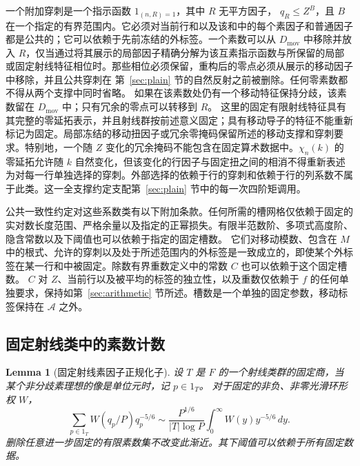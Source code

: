 \documentclass[11pt,a4paper]{article}
\numberwithin{equation}{section}
\numberwithin{figure}{section}
\newtheorem{lemma}[theorem]{Lemma}
\theoremstyle{definition}
\theoremstyle{remark}
\begin{document}
一个附加穿刺是一个指示函数 $1_{(n,R)=1}$，其中 $R$ 无平方因子，
$q_R\le Z^B$，且 $B$ 在一个指定的有界范围内。它必须对当前行和以及该和中的每个素因子和普通因子都是公共的；它可以依赖于先前冻结的外标签。一个素数可以从
$D_{\mathrm{mov}}$ 中移除并放入 $R$，仅当通过将其展示的局部因子精确分解为该互素指示函数与所保留的局部或固定射线特征相位时。那些相位必须保留，重构后的零点必须从展示的移动因子中移除，并且公共穿刺在
第~\ref{sec:plain} 节的自然反射之前被删除。任何零素数都不得从两个支撑中同时省略。
如果在该素数处仍有一个移动特征保持分歧，该素数留在
$D_{\mathrm{mov}}$ 中；只有冗余的零点可以转移到 $R$。
这里的固定有限射线特征具有其完整的零延拓表示，并且射线群按前述意义固定；具有移动导子的特征不能重新标记为固定。局部冻结的移动扭因子或冗余零掩码保留所述的移动支撑和穿刺要求。特别地，一个随 $Z$ 变化的冗余掩码不能包含在固定算术数据中。$\chi_n(k)$ 的零延拓允许随 $k$ 自然变化，但该变化的行因子与固定扭之间的相消不得重新表述为对每一行单独选择的穿刺。外部选择的依赖于行的穿刺和依赖于行的列系数不属于此类。这一全支撑约定支配第~\ref{sec:plain} 节中的每一次四阶矩调用。

公共一致性约定对这些系数类有以下附加条款。任何所需的槽网格仅依赖于固定的实对数长度范围、严格余量以及指定的正幂损失。有限半范数阶、多项式高度阶、隐含常数以及下阈值也可以依赖于指定的固定槽数。
它们对移动模数、包含在 $M$ 中的根式、允许的穿刺以及处于所述范围内的外标签是一致成立的，即使某个外标签在某一行和中被固定。除数有界重数定义中的常数 $C$ 也可以依赖于这个固定槽数。
$C$ 对 $Z$、当前行以及被平均的标签的独立性，以及重数仅依赖于 $f$ 的任何单独要求，保持如第~\ref{sec:arithmetic} 节所述。槽数是一个单独的固定参数，移动标签保持在 $\mathcal A$ 之外。

\subsection{固定射线类中的素数计数}\begin{lemma}[固定射线素因子正规化子]\label{lem:ray-prime-normalizer}
设 $T$ 是 $F$ 的一个射线类群的固定商，当某个非分歧素理想的像是单位元时，记
$p\in1_T$。
对于固定的非负、非零光滑环形权 $W$，
\begin{equation}\label{eq:ray-prime-normalizer}
 \sum_{p\in1_T}W(q_p/P)q_p^{-5/6}
 \sim\frac{P^{1/6}}{|T|\log P}
      \int_0^\infty W(y)y^{-5/6}\,dy.
\end{equation}
删除任意进一步固定的有限素数集不改变此渐近。其下阈值可以依赖于所有固定数据。
\end{lemma}
\end{document}
